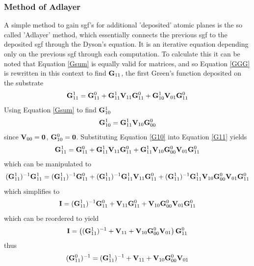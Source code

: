 \documentclass[a4paper, 12pt]{article}
\begin{document}
	\subsubsection{Method of Adlayer}
	A simple method to gain \gls{sgf}'s for additional 'deposited' atomic planes is the so called 'Adlayer' method, which essentially connects the previous \gls{sgf} to the deposited \gls{sgf} through the Dyson's equation. It is an iterative equation depending only on the previous \gls{sgf} through each computation. To calculate this it can be noted that Equation \eqref{Gsum} is equally valid for matrices, and so Equation \eqref{GGG} is rewritten in this context to find ${\bf G}_{11}$, the first Green's function deposited on the substrate
	\begin{equation}\label{G11}
	{\bf G}_{11}^1={\bf G}_{11}^0+{\bf G}_{11}^1{\bf V}_{11}{\bf G}_{11}^0 +{\bf G}_{10}^1{\bf V}_{01}{\bf G}_{11}^0
\end{equation}
Using Equation \eqref{Gsum} to find ${\bf G}_{10}^1$
\begin{equation}\label{G10}
	{\bf G}_{10}^1={\bf G}_{11}^1{\bf V}_{10}{\bf G}_{00}^0
\end{equation}
since ${\bf V}_{00} = \bf 0$, ${\bf G}_{10}^0 = \bf 0$. Substituting Equation \eqref{G10} into Equation \eqref{G11} yields
	\begin{equation}
	{\bf G}_{11}^1={\bf G}_{11}^0+{\bf G}_{11}^1{\bf V}_{11}{\bf G}_{11}^0 +{\bf G}_{11}^1{\bf V}_{10}{\bf G}_{00}^0{\bf V}_{01}{\bf G}_{11}^0
\end{equation}
which can be manipulated to
	\begin{equation}
		({\bf G}_{11}^1)^{-1}{\bf G}_{11}^1=({\bf G}_{11}^1)^{-1}{\bf G}_{11}^0+({\bf G}_{11}^1)^{-1}{\bf G}_{11}^1{\bf V}_{11}{\bf G}_{11}^0 +({\bf G}_{11}^1)^{-1}{\bf G}_{11}^1{\bf V}_{10}{\bf G}_{00}^0{\bf V}_{01}{\bf G}_{11}^0
\end{equation}
which simplifies to 
	\begin{equation}
		{\bf I}=({\bf G}_{11}^1)^{-1}{\bf G}_{11}^0+{\bf V}_{11}{\bf G}_{11}^0 +{\bf V}_{10}{\bf G}_{00}^0{\bf V}_{01}{\bf G}_{11}^0
\end{equation}
which can be reordered to yield
	\begin{equation}
		{\bf I}=\left(({\bf G}_{11}^1)^{-1}+{\bf V}_{11} +{\bf V}_{10}{\bf G}_{00}^0{\bf V}_{01}\right){\bf G}_{11}^0
\end{equation}
thus
	\begin{equation}
		({\bf G}_{11}^0)^{-1}=({\bf G}_{11}^1)^{-1}+{\bf V}_{11} +{\bf V}_{10}{\bf G}_{00}^0{\bf V}_{01}
	\end{equation}
\end{document}
